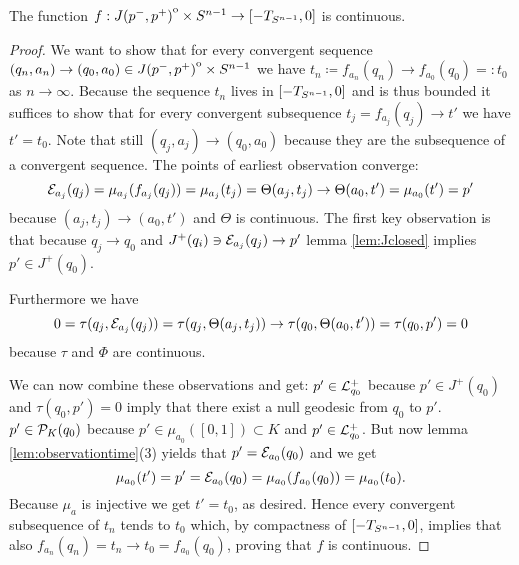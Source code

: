 


\begin{proposition}\label{prop:fcont} 
    The function $f:{\kern0ptJ(p^-,p^+)}^{\mathrm{o}}\times{S^{n-1}}\to[-T_{S^{n-1}},0]$ is continuous.
\end{proposition}
\begin{proof}
    We want to show that for every convergent sequence $(q_n,a_n)\to (q_0,a_0)\in {\kern0ptJ(p^-,p^+)}^{\mathrm{o}}\times {S^{n-1}}$ we have $t_n\coloneqq f_{a_n}(q_n)\to f_{a_0}(q_0)=:t_0$ as $n \to \infty$. Because the sequence $t_n$ lives in $[-T_{S^{n-1}},0]$ and is thus bounded it suffices to show that for every convergent subsequence $t_j = f_{a_j}(q_j) \to t'$ we have $t'=t_0$. Note that still $(q_j,a_j)\to (q_0,a_0)$ because they are the subsequence of a convergent sequence. The points of earliest observation converge:
    \[
        {\mathcal{E}}_{a_j}(q_j) = \mu_{a_j}(f_{a_j}(q_j)) = \mu_{a_j}(t_j) = \Theta(a_j,t_j) \to \Theta(a_0,t') = \mu_{a_0}(t')=p'
    \] because $(a_j,t_j)\to (a_0,t')$ and $\Theta$ is continuous.
    The first key observation is that  because $q_j\to q_0$ and $J^+(q_i)\ni{\mathcal{E}}_{a_j}(q_j) \to  p'$ lemma \ref{lem:Jclosed} implies $p'\in J^+(q_0)$.

    Furthermore we have
    \[
        0=\tau(q_j,{\mathcal{E}}_{a_j}(q_j))=\tau(q_j,\Theta(a_j,t_j))\to \tau(q_0,\Theta(a_0,t')) = \tau(q_0,p')=0
    \] because $\tau$ and $\Phi$ are continuous.

    We can now combine these observations and get: $p'\in {\mathcal{L}}^+_{q_0}$ because $p'\in J^+(q_0)$ and $\tau(q_0,p')=0$ imply that there exist a null geodesic from $q_0$ to $p'$. $p'\in {\mathcal{P}}_K(q_0)$ because $p'\in \mu_{a_0}([0,1])\subset K$ and $p'\in {\mathcal{L}}^+_{q_0}$. But now lemma \ref{lem:observationtime}(3) yields that $p'={\mathcal{E}}_{a_0}(q_0)$ and we get 
    \[
        \mu_{a_0}(t') = p' = {\mathcal{E}}_{a_0}(q_0) = \mu_{a_0}(f_{a_0}(q_0))= \mu_{a_0}(t_0).
    \]
    Because $\mu_a$ is injective we get $t'=t_0$, as desired. Hence every convergent subsequence of $t_n$ tends to $t_0$ which, by compactness of $[-T_{S^{n-1}},0]$, implies that also $f_{a_n}(q_n)=t_n \to t_0 = f_{a_0}(q_0)$, proving that $f$ is continuous.
\end{proof}

